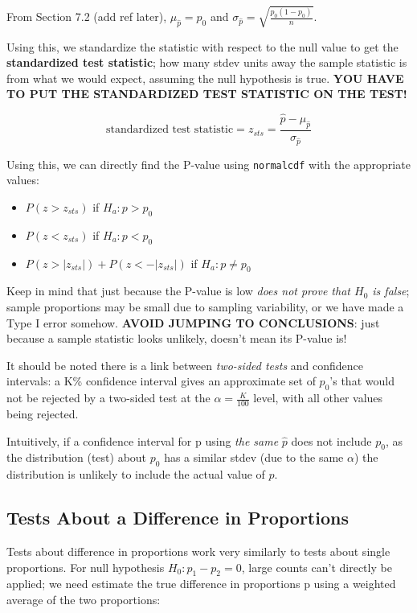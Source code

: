 \documentclass[12pt, a4paper]{article}
\theoremstyle{definition}
\begin{document}
From Section 7.2 (add ref later), $\mu_{\hat{p}} = p_0$ and $\sigma_{\hat{p}} = \sqrt{\frac{p_0(1-p_0)}{n}}$.

Using this, we standardize the statistic with respect to the null value to get the \textbf{standardized test statistic}; how many stdev units away the sample statistic is from what we would expect, assuming the null hypothesis is true.
\textbf{YOU HAVE TO PUT THE STANDARDIZED TEST STATISTIC ON THE TEST!}

\[\textrm{standardized test statistic} = z_{sts} = \frac{\hat{p} - \mu_{\hat{p}}}{\sigma_{\hat{p}}}\]

Using this, we can directly find the P-value using \verb|normalcdf| with the appropriate values:
\begin{itemize}
    \item $P(z > z_{sts})$ if $H_a : p > p_0$
    \item $P(z < z_{sts})$ if $H_a : p < p_0$
    \item $P(z > |z_{sts}|) + P(z < -|z_{sts}|)$ if $H_a : p \neq p_0$
\end{itemize}

Keep in mind that just because the P-value is low \textit{does not prove that $H_0$ is false}; sample proportions may be small due to sampling variability, or we have made a Type I error somehow. \textbf{AVOID JUMPING TO CONCLUSIONS}: just because a sample statistic looks unlikely, doesn't mean its P-value is!

It should be noted there is a link between \textit{two-sided tests} and confidence intervals: a K\% confidence interval gives an approximate set of $p_0$'s that would not be rejected by a two-sided test at the $\alpha = \frac{K}{100}$ level, with all other values being rejected.

Intuitively, if a confidence interval for p using \textit{the same} $\hat{p}$ does not include $p_0$, as the distribution (test) about $p_0$ has a similar stdev (due to the same $\alpha$) the distribution is unlikely to include the actual value of $p$.

\subsection{Tests About a Difference in Proportions}
Tests about difference in proportions work very similarly to tests about single proportions. For null hypothesis $H_0 : p_1 - p_2 = 0$, large counts can't directly be applied; we need estimate the true difference in proportions p using a weighted average of the two proportions:
\end{document}
